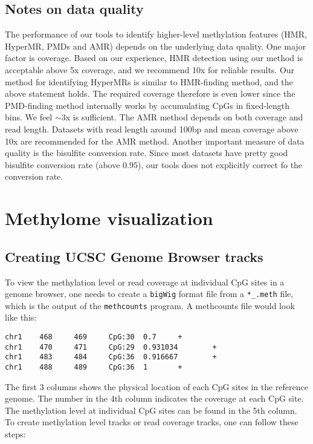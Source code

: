 \documentclass[10pt]{article}
\newcommand{\prog}[1]{\texttt{#1}}
\newcommand{\fn}[1]{\texttt{#1}}
\newcommand{\lit}[1]{\texttt{#1}}
\begin{document}
{{\subsection{Notes on data quality}
\label{sec:notes-data-quality}
The performance of our tools to identify higher-level methylation
features (HMR, HyperMR, PMDs and AMR) depends on the underlying data
quality. One major factor is coverage. Based on our experience, HMR
detection using our method is acceptable above 5x coverage, and we
recommend 10x for reliable results. Our method for identifying
HyperMRs is similar to HMR-finding method, and the above statement
holds. The required coverage therefore is even lower since the
PMD-finding method internally works by accumulating CpGs in
fixed-length bins. We feel $\sim$3x is sufficient. The AMR method
depends on both coverage and read length. Datasets with read length
around 100bp and mean coverage above 10x are recommended for the AMR
method. Another important measure of data quality is the bisulfite
conversion rate. Since most datasets have pretty good bisulfite
conversion rate (above $0.95$), our tools does not explicitly correct
fo the conversion rate.

\section{Methylome visualization}
\label{sec:visualization}

\subsection{Creating UCSC Genome Browser tracks}
\label{sec:browser}

To view the methylation level or read coverage at individual CpG sites
in a genome browser, one needs to create a \lit{bigWig} format file
from a \fn{*\_.meth} file, which is the output of the \prog{methcounts}
program. A methcounts file would look like this:

\begin{verbatim}
chr1    468     469     CpG:30  0.7     +
chr1    470     471     CpG:29  0.931034        +
chr1    483     484     CpG:36  0.916667        +
chr1    488     489     CpG:36  1       +
\end{verbatim}

The first 3 columns shows the physical location of each CpG sites in
the reference genome. The number in the 4th column indicates the
coverage at each CpG site. The methylation level at individual CpG
sites can be found in the 5th column. To create methylation level
tracks or read coverage tracks, one can follow these steps:

}}
\end{document}
